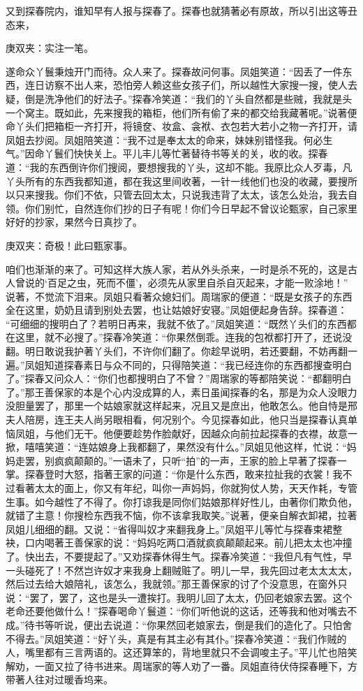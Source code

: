 \begin{parag}
    又到探春院内，谁知早有人报与探春了。探春也就猜著必有原故，所以引出这等丑态来，\begin{note}庚双夹：实注一笔。\end{note}遂命众丫鬟秉烛开门而待。众人来了。探春故问何事。凤姐笑道：“因丢了一件东西，连日访察不出人来，恐怕旁人赖这些女孩子们，所以越性大家搜一搜，使人去疑，倒是洗净他们的好法子。”探春冷笑道：“我们的丫头自然都是些贼，我就是头一个窝主。既如此，先来搜我的箱柜，他们所有偷了来的都交给我藏著呢。”说著便命丫头们把箱柜一齐打开，将镜奁、妆盒、衾袱、衣包若大若小之物一齐打开，请凤姐去抄阅。凤姐陪笑道：“我不过是奉太太的命来，妹妹别错怪我。何必生气。”因命丫鬟们快快关上。平儿丰儿等忙著替待书等关的关，收的收。探春道：“我的东西倒许你们搜阅，要想搜我的丫头，这却不能。我原比众人歹毒，凡丫头所有的东西我都知道，都在我这里间收著，一针一线他们也没的收藏，要搜所以只来搜我。你们不依，只管去回太太，只说我违背了太太，该怎么处治，我去自领。你们别忙，自然连你们抄的日子有呢！你们今日早起不曾议论甄家，自己家里好好的抄家，果然今日真抄了。\begin{note}庚双夹：奇极！此曰甄家事。\end{note}咱们也渐渐的来了。可知这样大族人家，若从外头杀来，一时是杀不死的，这是古人曾说的‘百足之虫，死而不僵’，必须先从家里自杀自灭起来，才能一败涂地！” 说著，不觉流下泪来。凤姐只看著众媳妇们。周瑞家的便道：“既是女孩子的东西全在这里，奶奶且请到别处去罢，也让姑娘好安寝。”凤姐便起身告辞。探春道： “可细细的搜明白了？若明日再来，我就不依了。”凤姐笑道：“既然丫头们的东西都在这里，就不必搜了。”探春冷笑道：“你果然倒乖。连我的包袱都打开了，还说没翻。明日敢说我护著丫头们，不许你们翻了。你趁早说明，若还要翻，不妨再翻一遍。”凤姐知道探春素日与众不同的，只得陪笑道：“我已经连你的东西都搜查明白了。”探春又问众人：“你们也都搜明白了不曾？”周瑞家的等都陪笑说：“都翻明白了。”那王善保家的本是个心内没成算的人，素日虽闻探春的名，那是为众人没眼力没胆量罢了，那里一个姑娘家就这样起来，况且又是庶出，他敢怎么。他自恃是邢夫人陪房，连王夫人尚另眼相看，何况别个。今见探春如此，他只当是探春认真单恼凤姐，与他们无干。他便要趁势作脸献好，因越众向前拉起探春的衣襟，故意一掀，嘻嘻笑道：“连姑娘身上我都翻了，果然没有什么。”凤姐见他这样，忙说：“妈妈走罢，别疯疯颠颠的。”一语未了，只听“拍”的一声，王家的脸上早著了探春一掌。探春登时大怒，指著王家的问道：“你是什么东西，敢来拉扯我的衣裳！我不过看著太太的面上，你又有年纪，叫你一声妈妈，你就狗仗人势，天天作耗，专管生事。如今越性了不得了。你打谅我是同你们姑娘那样好性儿，由著你们欺负他，就错了主意！你搜检东西我不恼，你不该拿我取笑。”说著，便亲自解衣卸裙，拉著凤姐儿细细的翻。又说：“省得叫奴才来翻我身上。”凤姐平儿等忙与探春束裙整袂，口内喝著王善保家的说：“妈妈吃两口酒就疯疯颠颠起来。前儿把太太也冲撞了。快出去，不要提起了。”又劝探春休得生气。探春冷笑道：“我但凡有气性，早一头碰死了！不然岂许奴才来我身上翻贼赃了。明儿一早，我先回过老太太太太，然后过去给大娘陪礼，该怎么，我就领。”那王善保家的讨了个没意思，在窗外只说：“罢了，罢了，这也是头一遭挨打。我明儿回了太太，仍回老娘家去罢。这个老命还要他做什么！”探春喝命丫鬟道：“你们听他说的这话，还等我和他对嘴去不成。”待书等听说，便出去说道：“你果然回老娘家去，倒是我们的造化了。只怕舍不得去。”凤姐笑道：“好丫头，真是有其主必有其仆。”探春冷笑道：“我们作贼的人，嘴里都有三言两语的。这还算笨的，背地里就只不会调唆主子。”平儿忙也陪笑解劝，一面又拉了待书进来。周瑞家的等人劝了一番。凤姐直待伏侍探春睡下，方带著人往对过暖香坞来。

\end{parag}
